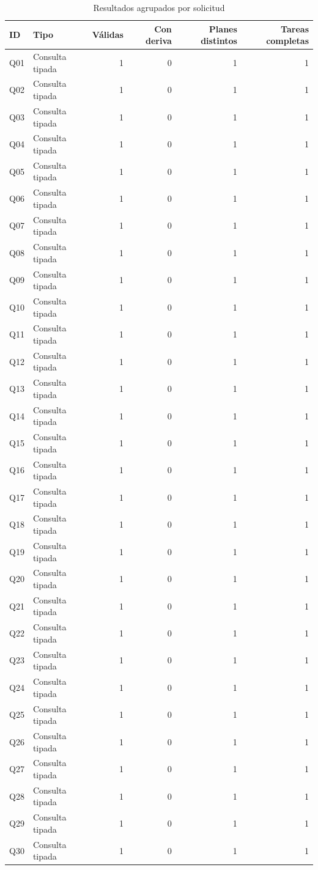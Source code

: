 \begin{table}[!t]
\caption{Resultados agrupados por solicitud}
\label{tab:multi_cases}
\centering\footnotesize
\begin{tabular*}{\textwidth}{@{\extracolsep{\fill}}llrrrr}
\hline
ID & Tipo & Válidas & Con deriva & Planes distintos & Tareas completas\\
\hline
Q01 & Consulta tipada & 1 & 0 & 1 & 1\\
Q02 & Consulta tipada & 1 & 0 & 1 & 1\\
Q03 & Consulta tipada & 1 & 0 & 1 & 1\\
Q04 & Consulta tipada & 1 & 0 & 1 & 1\\
Q05 & Consulta tipada & 1 & 0 & 1 & 1\\
Q06 & Consulta tipada & 1 & 0 & 1 & 1\\
Q07 & Consulta tipada & 1 & 0 & 1 & 1\\
Q08 & Consulta tipada & 1 & 0 & 1 & 1\\
Q09 & Consulta tipada & 1 & 0 & 1 & 1\\
Q10 & Consulta tipada & 1 & 0 & 1 & 1\\
Q11 & Consulta tipada & 1 & 0 & 1 & 1\\
Q12 & Consulta tipada & 1 & 0 & 1 & 1\\
Q13 & Consulta tipada & 1 & 0 & 1 & 1\\
Q14 & Consulta tipada & 1 & 0 & 1 & 1\\
Q15 & Consulta tipada & 1 & 0 & 1 & 1\\
Q16 & Consulta tipada & 1 & 0 & 1 & 1\\
Q17 & Consulta tipada & 1 & 0 & 1 & 1\\
Q18 & Consulta tipada & 1 & 0 & 1 & 1\\
Q19 & Consulta tipada & 1 & 0 & 1 & 1\\
Q20 & Consulta tipada & 1 & 0 & 1 & 1\\
Q21 & Consulta tipada & 1 & 0 & 1 & 1\\
Q22 & Consulta tipada & 1 & 0 & 1 & 1\\
Q23 & Consulta tipada & 1 & 0 & 1 & 1\\
Q24 & Consulta tipada & 1 & 0 & 1 & 1\\
Q25 & Consulta tipada & 1 & 0 & 1 & 1\\
Q26 & Consulta tipada & 1 & 0 & 1 & 1\\
Q27 & Consulta tipada & 1 & 0 & 1 & 1\\
Q28 & Consulta tipada & 1 & 0 & 1 & 1\\
Q29 & Consulta tipada & 1 & 0 & 1 & 1\\
Q30 & Consulta tipada & 1 & 0 & 1 & 1\\
\hline
\end{tabular*}
\end{table}
